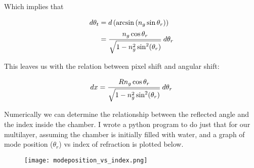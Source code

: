 Which implies that

\begin{equation*}
\begin{split}
	d\theta_t & = d\left(\arcsin\left(n_g \sin{\theta_r}\right)\right) \\
			  & = \cfrac{n_g \cos{\theta_r}}{\sqrt{1-n_g^2 \sin^{2}(\theta_r)}}\,\,d\theta_r
\end{split}
\end{equation*}

This leaves us with the relation between pixel shift and angular shift:

\begin{equation}
	dx = \cfrac{R n_g \cos{\theta_r}}{\sqrt{1-n_g^2 \sin^{2}(\theta_r)}} \,\,d\theta_r
\end{equation}

Numerically we can determine the relationship between the reflected angle and the index inside the chamber. I wrote a python program to do just that for our multilayer, assuming the chamber is initially filled with water, and a graph of mode position ($\theta_r$) vs index of refraction is plotted below.

\begin{figure}[h]
\begin{center}
\texttt{[image: modeposition\_vs\_index.png]}
\end{center}
\end{figure}